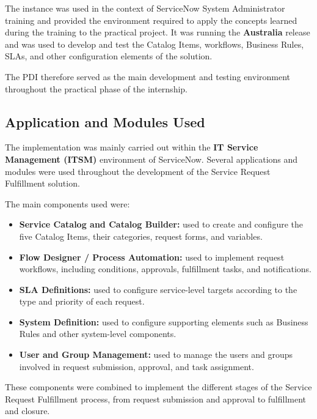 \documentclass[12pt,a4paper]{report}
\begin{document}
The instance was used in the context of ServiceNow System Administrator
training and provided the environment required to apply the concepts learned
during the training to the practical project. It was running the
\textbf{Australia} release and was used to develop and test the Catalog Items,
workflows, Business Rules, SLAs, and other configuration elements of the
solution.

The PDI therefore served as the main development and testing environment
throughout the practical phase of the internship.


\subsection{Application and Modules Used}
The implementation was mainly carried out within the \textbf{IT Service
Management (ITSM)} environment of ServiceNow. Several applications and
modules were used throughout the development of the Service Request
Fulfillment solution.

The main components used were:

\begin{itemize}
    \item \textbf{Service Catalog and Catalog Builder:} used to create and
    configure the five Catalog Items, their categories, request forms, and
    variables.

    \item \textbf{Flow Designer / Process Automation:} used to implement
    request workflows, including conditions, approvals, fulfillment tasks,
    and notifications.

    \item \textbf{SLA Definitions:} used to configure service-level targets
    according to the type and priority of each request.

    \item \textbf{System Definition:} used to configure supporting elements
    such as Business Rules and other system-level components.

    \item \textbf{User and Group Management:} used to manage the users and
    groups involved in request submission, approval, and task assignment.
\end{itemize}

These components were combined to implement the different stages of the
Service Request Fulfillment process, from request submission and approval to
fulfillment and closure.
\end{document}
